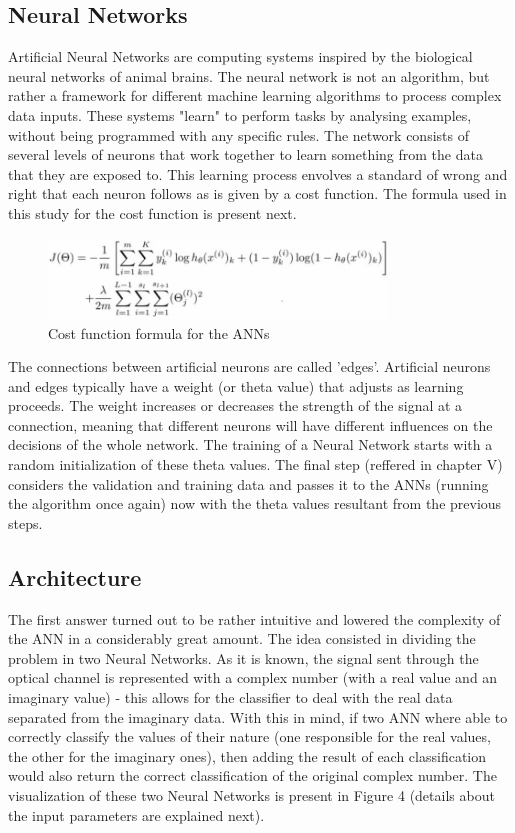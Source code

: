 \documentclass[10pt]{IEEEtran}
\begin{document}
\subsection{Neural Networks}
Artificial Neural Networks are computing systems inspired by the biological neural networks of animal brains. The neural network is not an algorithm, but rather a framework for different machine learning algorithms to process complex data inputs. These systems "learn" to perform tasks by analysing examples, without being programmed with any specific rules.
The network consists of several levels of neurons that work together to learn something from the data that they are exposed to. This learning process envolves a standard of wrong and right that each neuron follows as is given by a cost function. The formula used in this study for the cost function is present next.

\begin{figure}[H]
\centering
\includegraphics[width=9cm]{costfunctionformula.jpg}
\caption{Cost function formula for the ANNs}
\end{figure}

The connections between artificial neurons are called 'edges'. Artificial neurons and edges typically have a weight (or theta value) that adjusts as learning proceeds. The weight increases or decreases the strength of the signal at a connection, meaning that different neurons will have different influences on the decisions of the whole network. The training of a Neural Network starts with a random initialization of these theta values. The final step (reffered in chapter V) considers the validation and training data and passes it to the ANNs (running the algorithm once again) now with the theta values resultant from the previous steps.

\subsection{Architecture}
The first answer turned out to be rather intuitive and lowered the complexity of the ANN in a considerably great amount. The idea consisted in dividing the problem in two Neural Networks.
As it is known, the signal sent through the optical channel is represented with a complex number (with a real value and an imaginary value) - this allows for the classifier to deal with the real data separated from the imaginary data. With this in mind, if two ANN where able to correctly classify the values of their nature (one responsible for the real values, the other for the imaginary ones), then adding the result of each classification would also return the correct classification of the original complex number.
The visualization of these two Neural Networks is present in Figure 4 (details about the input parameters are explained next).
\end{document}
